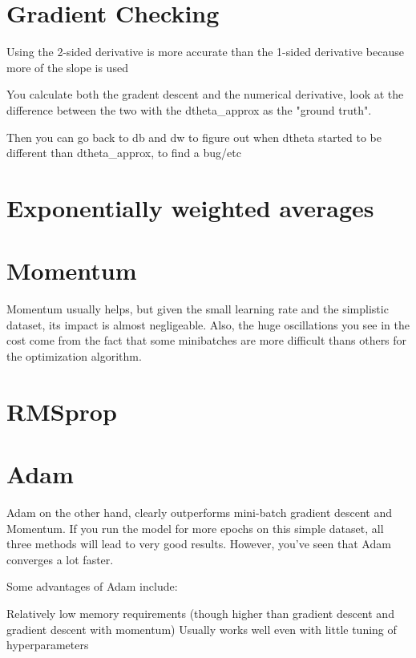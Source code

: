 \documentclass[11pt, onecolumn]{article}
\begin{document}
\section{Gradient Checking}

Using the 2-sided derivative is more accurate than the 1-sided derivative because more of the slope is used

You calculate both the gradent descent and the numerical derivative, look at the difference between the two with the dtheta_approx as the "ground truth".  

Then you can go back to db and dw to figure out when dtheta started to be different than dtheta_approx, to find a bug/etc



\section{Exponentially weighted averages}






\section{Momentum}
Momentum usually helps, but given the small learning rate and the simplistic dataset, its impact is almost negligeable. Also, the huge oscillations you see in the cost come from the fact that some minibatches are more difficult thans others for the optimization algorithm.


\section{RMSprop}


\section{Adam}
Adam on the other hand, clearly outperforms mini-batch gradient descent and Momentum. If you run the model for more epochs on this simple dataset, all three methods will lead to very good results. However, you've seen that Adam converges a lot faster.

Some advantages of Adam include:

    Relatively low memory requirements (though higher than gradient descent and gradient descent with momentum)
    Usually works well even with little tuning of hyperparameters
    
    
    
\end{document}
